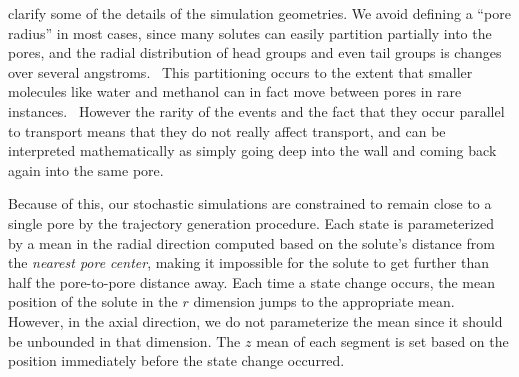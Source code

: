 \documentclass{article}
\begin{document}
\begin{enumerate}[label={Comment \theenumi :}, leftmargin=3.9\parindent]

    clarify some of the details of the simulation geometries.  We
    avoid defining a ``pore radius'' in most cases, since many solutes
    can easily partition partially into the pores, and the radial
    distribution of head groups and even tail groups is changes over
    several angstroms.~\cite{yourpapers} This partitioning occurs to the extent that smaller molecules like water and methanol can in fact
    move between pores in rare instances.~\cite{yourpapers} However the rarity of the events and the fact that they occur parallel to transport means that they do not really affect transport, and can be interpreted mathematically as simply going deep into the wall and coming back again into the same pore.
    
    Because of this, our stochastic simulations are constrained to remain close to a single pore by the trajectory generation procedure.
    Each state is parameterized by a mean in the radial direction computed based on the solute's 
    distance from the \textit{nearest pore center}, making it impossible for the solute to get 
    further than
    half the pore-to-pore distance away.
    Each time a state change occurs, the mean position of the
    solute in the $r$ dimension jumps to the appropriate mean. However, in the axial direction, 
    we do not parameterize the mean since it should be unbounded in that dimension. The $z$ mean
    of each segment is set based on the position immediately before the state change occurred.
    

\end{enumerate}
\end{document}
